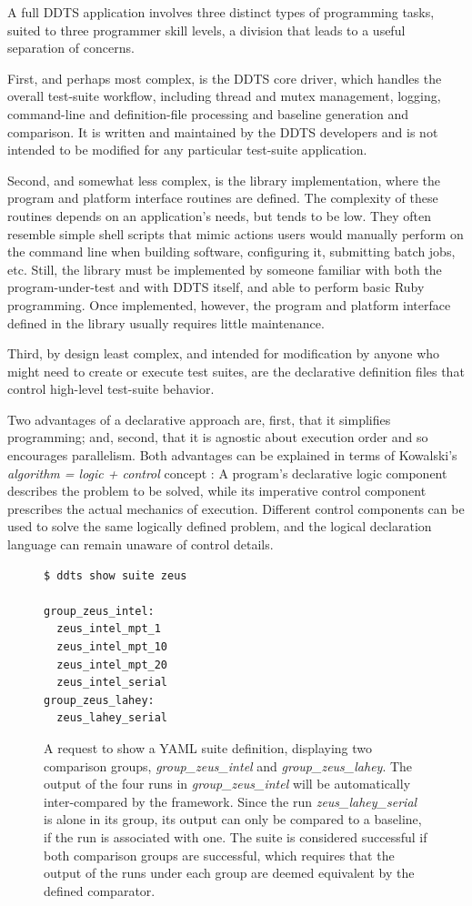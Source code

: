\documentclass[conference]{IEEEtran}
\begin{document}
A full DDTS application involves three distinct types of programming tasks, suited to three programmer skill levels, a division that leads to a useful separation of concerns.

First, and perhaps most complex, is the DDTS core driver, which handles the overall test-suite workflow, including thread and mutex management, logging, command-line and definition-file processing and baseline generation and comparison. It is written and maintained by the DDTS developers and is not intended to be modified for any particular test-suite application.

Second, and somewhat less complex, is the library implementation, where the program and platform interface routines are defined. The complexity of these routines depends on an application's needs, but tends to be low. They often resemble simple shell scripts that mimic actions users would manually perform on the command line when building software, configuring it, submitting batch jobs, etc. Still, the library must be implemented by someone familiar with both the program-under-test and with DDTS itself, and able to perform basic Ruby programming. Once implemented, however, the program and platform interface defined in the library usually requires little maintenance.

Third, by design least complex, and intended for modification by anyone who might need to create or execute test suites, are the declarative definition files that control high-level test-suite behavior.

Two advantages of a declarative approach are, first, that it simplifies programming; and, second, that it is agnostic about execution order and so encourages parallelism. Both advantages can be explained in terms of Kowalski's \emph{algorithm = logic + control} concept \cite{logic-control}: A program's declarative logic component describes the problem to be solved, while its imperative control component prescribes the actual mechanics of execution. Different control components can be used to solve the same logically defined problem, and the logical declaration language can remain unaware of control details.

\begin{figure}[!t]
{\small \begin{verbatim}
$ ddts show suite zeus

group_zeus_intel: 
  zeus_intel_mpt_1
  zeus_intel_mpt_10
  zeus_intel_mpt_20
  zeus_intel_serial
group_zeus_lahey: 
  zeus_lahey_serial
\end{verbatim} }
\caption{A request to show a YAML suite definition, displaying two comparison groups, \emph{group\_zeus\_intel} and \emph{group\_zeus\_lahey}. The output of the four runs in \emph{group\_zeus\_intel} will be automatically inter-compared by the framework. Since the run \emph{zeus\_lahey\_serial} is alone in its group, its output can only be compared to a baseline, if the run is associated with one. The suite is considered successful if both comparison groups are successful, which requires that the output of the runs under each group are deemed equivalent by the defined comparator.}
\label{figure:2}
\end{figure}
\end{document}
